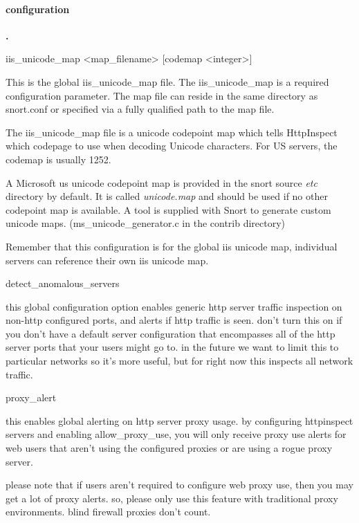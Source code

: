 \documentclass[english]{report}
\newcounter{slistnum}
\newenvironment{slist}{
    \begin{list}{
        {
            \bf \arabic{slistnum}.
        } 
    }{
        \usecounter{slistnum} 
    }
}{
    \end{list} 
}
\newenvironment{note}{
    \vspace{10pt}{\textsf{
        {\Huge{$\triangle$\hspace{-12.5pt}{\Large{$^!$}}}}\hspace{5pt}
        {\Large{NOTE}}
    }
    }

    \begin{center}
    \par\vspace{-10pt}
    \begin{lrbox}{\savepar}
    \begin{minipage}[r]{6.2in}
}
{
    \end{minipage}
    \end{lrbox}
    \fbox{
        \usebox{
            \savepar
        }
    }
    \par\vskip10pt
    \end{center}
}
\begin{document}
\paragraph{configuration}
\begin{slist}
\item iis\_unicode\_map <map\_filename> [codemap <integer>]

This is the global iis\_unicode\_map file.  The iis\_unicode\_map is a required
configuration parameter.  The map file can reside in the same directory as
snort.conf or specified via a fully qualified path to the map file.

The iis\_unicode\_map file is a unicode codepoint map which tells HttpInspect
which codepage to use when decoding Unicode characters.  For US servers, the
codemap is usually 1252.

A Microsoft us unicode codepoint map is provided in the snort source \emph{etc}
directory by default.  It is called \emph{unicode.map} and should be used if no
other codepoint map is available.  A tool is supplied with Snort to generate
custom unicode maps.   (ms\_unicode\_generator.c in the contrib directory)

\begin{note}
Remember that this configuration is for the global iis unicode map, individual
servers can reference their own iis unicode map.
\end{note}

\item detect\_anomalous\_servers

this global configuration option enables generic http server traffic
inspection on non-http configured ports, and alerts if http traffic is seen.
don't turn this on if you don't have a default server configuration that
encompasses all of the http server ports that your users might go to.  in the
future we want to limit this to particular networks so it's more useful, but
for right now this inspects all network traffic.

\item proxy\_alert

this enables global alerting on http server proxy usage.  by configuring
httpinspect servers and enabling allow\_proxy\_use, you will only receive proxy
use alerts for web users that aren't using the configured proxies or are using
a rogue proxy server.

please note that if users aren't required to configure web proxy use, then
you may get a lot of proxy alerts.  so, please only use this feature with
traditional proxy environments. blind firewall proxies don't count.

\end{slist}
\end{document}
